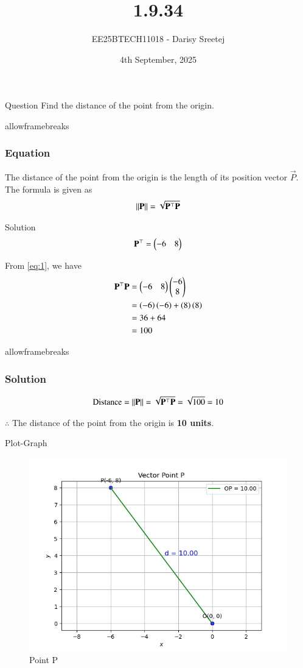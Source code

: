 \documentclass{beamer}
\title{1.9.34}
\date{4th September, 2025}
\author{EE25BTECH11018 - Darisy Sreetej}
\begin{document}
\frame{\titlepage}
\begin{frame}{Question}
Find the distance of the point  from the origin.
\end{frame}

\begin{frame}{allowframebreaks}
\frametitle{Equation}
The distance of the point from the origin is the length of its position vector $\vec{P}$. The formula is given as 
\begin{align}
\left\lVert\mathbf{P}\right\rVert = \sqrt{\mathbf{P}^\top \mathbf{P}} \label{eq:1}
\end{align}
\end{frame}

\begin{frame}{Solution}
\begin{align*}
    \mathbf{P}^\top = \begin{pmatrix}-6 & 8\end{pmatrix}
\end{align*}

From \ref{eq:1}, we have
\begin{align}
    \mathbf{P}^\top \mathbf{P} &= \begin{pmatrix}-6 & 8\end{pmatrix} \begin{pmatrix}-6 \\ 8\end{pmatrix} \\
    &= \left(-6\right)\left(-6\right) + \left(8\right)\left(8\right) \\
    &= 36 + 64 \\
    &= 100
\end{align}
\end{frame}

\begin{frame}{allowframebreaks}
\frametitle{Solution}
\begin{align*}
    \text{Distance} = \left\lVert\mathbf{P}\right\rVert = \sqrt{\mathbf{P}^\top \mathbf{P}} = \sqrt{100} = 10
\end{align*}

$\therefore$ The distance of the point  from the origin is \textbf{10 units}.
\end{frame}

\begin{frame}{Plot-Graph}
    \begin{figure}
        \centering
        \includegraphics[width=0.5\columnwidth]{../figs/fig.png}
        \caption{Point P}
        \label{fig:fig}
    \end{figure}
\end{frame}
\end{document}
